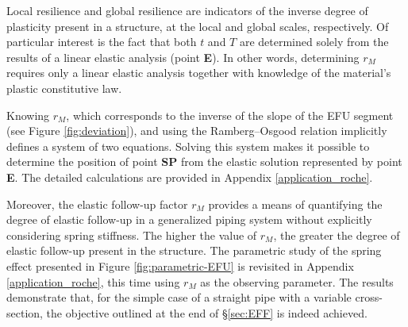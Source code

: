 \documentclass[10pt,a4paper]{article}
\begin{document}
Local resilience and global resilience are indicators of the inverse degree of plasticity present in a structure, at the local and global scales, respectively. Of particular interest is the fact that both \(t\) and \(T\) are determined solely from the results of a linear elastic analysis (point \textbf{E}). In other words, determining \(r_M\) requires only a linear elastic analysis together with knowledge of the material's plastic constitutive law.

Knowing \(r_M\), which corresponds to the inverse of the slope of the EFU segment (see Figure \ref{fig:deviation}), and using the Ramberg--Osgood relation implicitly defines a system of two equations. Solving this system makes it possible to determine the position of point \textbf{SP} from the elastic solution represented by point \textbf{E}. The detailed calculations are provided in Appendix \ref{application_roche}.

Moreover, the elastic follow-up factor \(r_M\) provides a means of quantifying the degree of elastic follow-up in a generalized piping system without explicitly considering spring stiffness. The higher the value of \(r_M\), the greater the degree of elastic follow-up present in the structure. The parametric study of the spring effect presented in Figure \ref{fig:parametric-EFU} is revisited in Appendix \ref{application_roche}, this time using \(r_M\) as the observing parameter. The results demonstrate that, for the simple case of a straight pipe with a variable cross-section, the objective outlined at the end of §\ref{sec:EFF} is indeed achieved.
\end{document}
